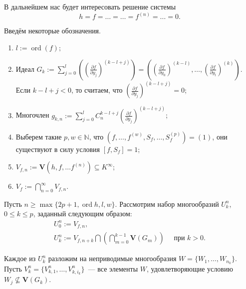 \documentclass[16pt]{article}
\DeclareMathOperator{\ord}{ord}
\renewcommand{\le}{\leqslant} %
\renewcommand{\ge}{\geqslant} %
\theoremstyle{plain1}
\theoremstyle{plain2}
\theoremstyle{plain}
\theoremstyle{plain3}
\theoremstyle{definition}
\theoremstyle{remark}
\begin{document}
В дальнейшем нас будет интересовать решение системы
\begin{equation}h=f=\ldots=\ldots=f^{(n)}=\ldots=0. \end{equation}

Введём некоторые обозначения.
\begin{enumerate}

  \item $l:=\ord (f);$

  \item Идеал $G_k := \sum\limits_{j=0}^l\left(\left(\frac{\partial f}{\partial y_j}\right)^{(k-l+j)}\right) = \left(\left(\frac{\partial f}{\partial y_0}\right)^{(k-l)},\ldots ,\left(\frac{\partial f}{\partial y_l}\right)^{(k)} \right)$.
  \\Если $k-l+j<0$, то считаем, что $\left(\frac{\partial f}{\partial y_j}\right)^{(k-l+j)} = 0$;

  \item Многочлен $g_{k,n}:=\sum\limits_{j=0}^{l}C_n^{k-l+j}\left(\frac{\partial f}{\partial y_j}\right)^{(k-l+j)}$;

  \item Выберем  такие $p,w\in \mathbb{N}$, что $\left(f,\ldots,f^{(w)},S_f,\ldots,S_f^{(p)}\right)=(1)$, они существуют в силу условия
  $[f,S_f]=1$;

  \item ${V}_{f,n}:=\mathbf{V}\left(h,f,\ldots f^{(n)}\right)\subseteq K^{\infty}$;

  \item
  ${V}_{f}:=\bigcap\limits_{n=0}^{\infty}V_{f,n}$.

\end{enumerate}



Пусть $n \ge\max\{ 2p+1,\ord{h},l,w\}$. Рассмотрим набор многообразий ${U}_k^n$, $0\le k\le p$, заданный следующим образом:
\begin{gather*}
{U}_{0}^n:={V}_{f,n},\\
{U}_k^n:={V}_{f,n+k}\bigcap\left(\bigcap\limits_{m=0}^{k-1}\mathbf{V}\left(G_m\right)\right) \quad \text{ при } k>0.
\end{gather*}

Каждое из ${U}^n_k$ разложим на неприводимые многообразия $W=\{{W}_{1},\ldots,{W}_{n_k}\}$. Пусть $V^n_k=\{{V}^n_{k,1},\ldots,{V}^n_{k,i_k}\}$~--- все элементы $W$, удовлетворяющие условию ${W}_{j}\not\subseteq\mathbf{V}(G_k)$.
\end{document}

